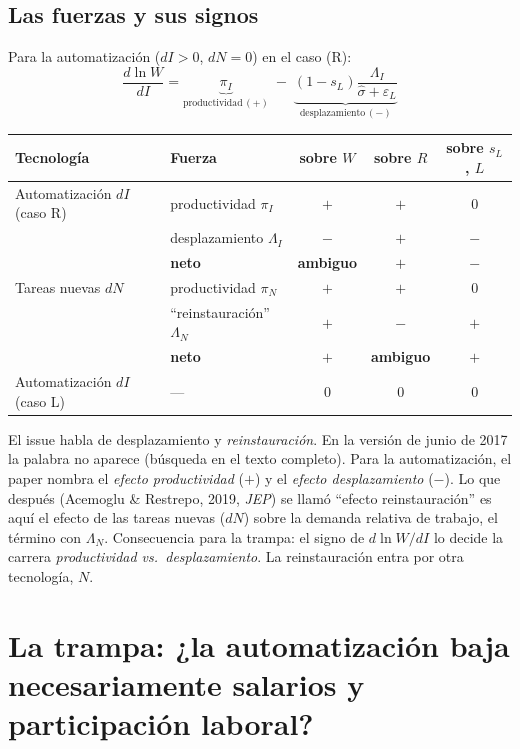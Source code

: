 \documentclass[11pt,a4paper]{article}
\theoremstyle{definition}
\theoremstyle{plain}
\theoremstyle{remark}
\numberwithin{equation}{section}
\newcommand{\sh}{\hat\sigma}
\newcommand{\eps}{\varepsilon}
\begin{document}
\subsection{Las fuerzas y sus signos}
Para la automatización ($dI>0$, $dN=0$) en el caso (R):
\begin{equation}\label{eq:trap}
  \boxed{\;\frac{d\ln W}{dI}=\underbrace{\pi_I}_{\text{productividad}\,(+)}\;-\;\underbrace{(1-s_L)\frac{\Lambda_I}{\sh+\eps_L}}_{\text{desplazamiento}\,(-)}\;}
\end{equation}
\begin{center}
\begin{tabular}{@{}llccc@{}}
\toprule
Tecnología & Fuerza & sobre $W$ & sobre $R$ & sobre $s_L$, $L$\\
\midrule
Automatización $dI$ (caso R) & productividad $\pi_I$ & $+$ & $+$ & 0\\
 & desplazamiento $\Lambda_I$ & $-$ & $+$ & $-$\\
 & \textbf{neto} & \textbf{ambiguo} & $+$ & $-$\\
\midrule
Tareas nuevas $dN$ & productividad $\pi_N$ & $+$ & $+$ & 0\\
 & ``reinstauración'' $\Lambda_N$ & $+$ & $-$ & $+$\\
 & \textbf{neto} & $+$ & \textbf{ambiguo} & $+$\\
\midrule
Automatización $dI$ (caso L) & — & 0 & 0 & 0\\
\bottomrule
\end{tabular}
\end{center}

\begin{alerta}
El issue habla de desplazamiento y \emph{reinstauración}. En la versión de junio de 2017 la palabra no aparece
(búsqueda en el texto completo). Para la automatización, el paper nombra el \emph{efecto productividad} ($+$) y el
\emph{efecto desplazamiento} ($-$). Lo que después (Acemoglu \& Restrepo, 2019, \emph{JEP}) se llamó ``efecto
reinstauración'' es aquí el efecto de las tareas nuevas ($dN$) sobre la demanda relativa de trabajo, el término con
$\Lambda_N$. Consecuencia para la trampa: el signo de $d\ln W/dI$ lo decide la carrera \emph{productividad vs.\
desplazamiento}. La reinstauración entra por otra tecnología, $N$.
\end{alerta}

\section{La trampa: ¿la automatización baja necesariamente salarios y participación laboral?}\label{sec:trampa}
\end{document}
